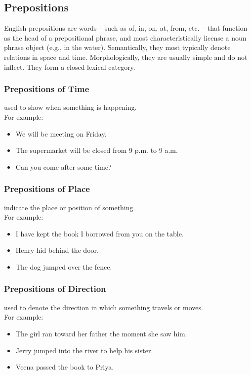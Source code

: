 \subsection{Prepositions \cite{wiki-English_prepositions}}
English prepositions are words – such as of, in, on, at, from, etc. – that function as the head of a prepositional phrase, and most characteristically license a noun phrase object (e.g., in the water). Semantically, they most typically denote relations in space and time. Morphologically, they are usually simple and do not inflect. They form a closed lexical category.

\subsubsection{Prepositions of Time \cite{byjus-english-prepositions}}
used to show when something is happening.\\
For example:
\begin{itemize}
    \item We will be meeting on Friday.
    \item The supermarket will be closed from 9 p.m. to 9 a.m.
    \item Can you come after some time?
\end{itemize}


\subsubsection{Prepositions of Place \cite{byjus-english-prepositions}}
indicate the place or position of something. \\
For example:
\begin{itemize}
    \item I have kept the book I borrowed from you on the table.
    \item Henry hid behind the door.
    \item The dog jumped over the fence.
\end{itemize}

\subsubsection{Prepositions of Direction \cite{byjus-english-prepositions}}
used to denote the direction in which something travels or moves.\\
For example:
\begin{itemize}
    \item The girl ran toward her father the moment she saw him.
    \item Jerry jumped into the river to help his sister.
    \item Veena passed the book to Priya.
\end{itemize}

